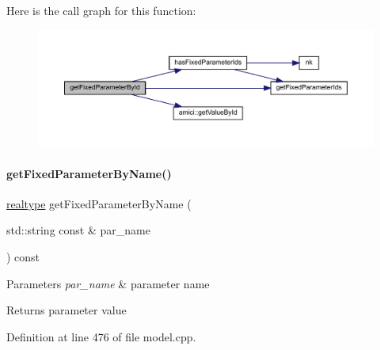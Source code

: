 Here is the call graph for this function\+:
\nopagebreak
\begin{figure}[H]
\begin{center}
\leavevmode
\includegraphics[width=350pt]{classamici_1_1_model_acc647ebbeaf0be737c7c165fa77eeca5_cgraph}
\end{center}
\end{figure}
\mbox{\label{classamici_1_1_model_a99cc00a08b2f2d87d3eac047d00a7c57}} 
\paragraph{\texorpdfstring{get\+Fixed\+Parameter\+By\+Name()}{getFixedParameterByName()}}
{\footnotesize\ttfamily \mbox{\hyperlink{namespaceamici_a1bdce28051d6a53868f7ccbf5f2c14a3}{realtype}} get\+Fixed\+Parameter\+By\+Name (\begin{DoxyParamCaption}\item[{std\+::string const \&}]{par\+\_\+name }\end{DoxyParamCaption}) const}


\begin{DoxyParams}{Parameters}
{\em par\+\_\+name} & parameter name \\
\hline
\end{DoxyParams}
\begin{DoxyReturn}{Returns}
parameter value 
\end{DoxyReturn}


Definition at line 476 of file model.\+cpp.

